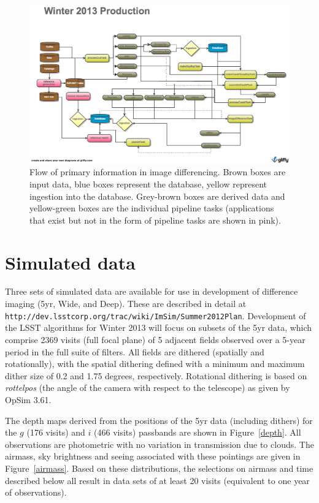 \documentclass[12pt]{article}
\begin{document}
\begin{figure}
\includegraphics[width=\textwidth]{Figures/Winter_2013.png}
\caption{Flow of primary information in image differencing. Brown
  boxes are input data, blue boxes represent the database, yellow
  represent ingestion into the database. Grey-brown boxes are derived
  data and yellow-green boxes are the individual pipeline tasks (applications
  that exist but not in the form of pipeline tasks are shown in pink).}
\label{flow}
\end{figure}

\clearpage 

\section{Simulated data} 

Three sets of simulated data are available for use in development of
difference imaging (5yr, Wide, and Deep). These are described in
detail at {\tt
  http://dev.lsstcorp.org/trac/wiki/ImSim/Summer2012Plan}.
Development of the LSST algorithms for Winter 2013 will focus on
subsets of the 5yr data, which comprise 2369 visits (full focal plane)
of 5 adjacent fields observed over a 5-year period in the full suite
of filters. All fields are dithered (spatially and rotationally), with the
spatial dithering defined with a minimum and maximum dither size of
0.2 and 1.75 degrees, respectively. Rotational dithering is based on
{\it rottelpos} (the angle of the camera with respect to the
telescope) as given by OpSim 3.61.

The depth maps derived from the positions of the 5yr data (including
dithers) for the $g$ (176 visits) and $i$ (466 visits) passbands are
shown in Figure~\ref{depth}. All observations are photometric with no
variation in transmission due to clouds. The airmass, sky brightness
and seeing associated with these pointings are given in
Figure~\ref{airmass}. Based on these distributions, the selections on
airmass and time described below all result in data sets of at least
20 visits (equivalent to one year of observations).
\end{document}
